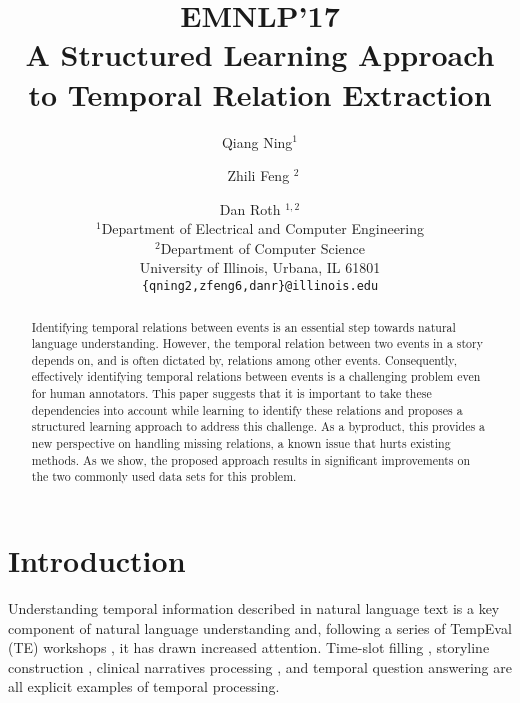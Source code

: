 \documentclass[11pt,letterpaper]{article}
\title{ \vspace*{-0.5in}
{{\small \hfill EMNLP'17}\\
\vspace*{.25in}} A Structured Learning Approach to Temporal Relation Extraction}
\author{Qiang Ning$^1$ \and ~Zhili Feng $^2$ \and Dan Roth $^{1,2}$ \\
	$^1$Department of Electrical and Computer Engineering\\
	$^2$Department of Computer Science\\
	University of Illinois, Urbana, IL 61801\\
	{\tt \{qning2,zfeng6,danr\}@illinois.edu} \\}
\date{}
\newcommand{\ignore}[1]{}
\newcommand{\final}[1]{#1}
\begin{document}
	
	\maketitle
	
	\begin{abstract}
Identifying temporal relations between events is an essential step towards natural language understanding. However, the temporal relation between two events in a story depends on, and is often dictated by, relations among other events. Consequently, effectively identifying  temporal relations between events is a challenging problem even for human annotators. 
This paper suggests that it is important to take these dependencies into account while learning to identify these relations and proposes a structured learning approach to address this challenge. As a byproduct, this provides a new perspective on handling missing relations, a known issue that hurts existing methods. 
As we show, the proposed approach results in significant improvements on the two commonly used data sets for this problem. 
		
		\ignore{Identifying temporal relations between events is an essential step towards natural language understanding. However, the temporal relation between two events in a story cannot be determined in isolation. The relations among many other events should be taken into account, making the effective identification of temporal relations a challenging problem even for human annotators. 
This paper proposes a structured learning approach to address this challenge and a new perspective towards the vast majority of missing relations, the treatment of which is known to be a major issue that hurts existing methods. 
The proposed approach results in significant improvements on two evaluation sets, compared to the state-of-the-art on this problem. 
		}
	\end{abstract}
	\section{Introduction} \label{sec:intro}

\ignore{Can we describe the method under CCM?}

Understanding temporal information described in natural language text is a key component of natural language understanding \citep{mani2006machine, verhagen2007semeval, chambers2007classifying, bethard2007cu} \final{and, following} a series of TempEval (TE) workshops \citep{verhagen2007semeval,verhagen2010semeval,uzzaman2013TE3}, it has drawn \final{increased} attention.
Time-slot filling \citep{surdeanu2013overview,ji2014tackling}, storyline construction \citep{DoLuRo12,minard2015semeval}, clinical narratives processing \citep{JindalRo13d,bethard2016semeval}, and temporal question answering \citep{llorens2015semeval} are all explicit examples of temporal processing. 
	
\end{document}
